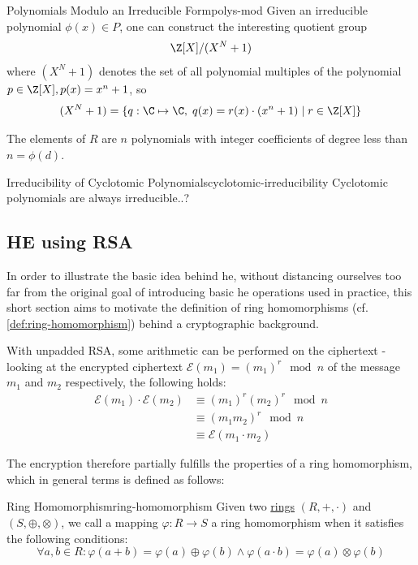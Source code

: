 \begin{corollary}{Polynomials Modulo an Irreducible Form}{polys-mod}
  Given an irreducible polynomial $\phi(x) \in P$, one can construct the interesting quotient group
  $$\Z[X] / (X^N + 1)$$
  where $(X^N + 1)$ denotes the set of all polynomial multiples of the polynomial $p \in \Z[X], p(x) = x^n + 1$, so
  $$(X^N+1) = \{q: \C \mapsto \C,\; q(x) = r(x) \cdot (x^n+1) \;|\; r \in \Z[X]\}$$

  The elements of $R$ are $n$ polynomials with integer coefficients of degree less than $n = \phi(d)$.
\end{corollary}

\begin{remark}{Irreducibility of Cyclotomic Polynomials}{cyclotomic-irreducibility}
  Cyclotomic polynomials are always irreducible..?
\end{remark}

\subsection{HE using RSA}
In order to illustrate the basic idea behind \Gls{he}, without distancing ourselves too far
from the original goal of introducing basic \gls{he} operations used in practice, this short section aims to motivate
the definition of ring homomorphisms (cf. \autoref{def:ring-homomorphism}) behind a cryptographic background.

With unpadded RSA, some arithmetic can be performed on the ciphertext - %
looking at the encrypted ciphertext $\mathcal{E}(m_1) = (m_1)^r \mod n$
of the message $m_1$ and $m_2$ respectively, the following holds:
\begin{align*}
  \mathcal{E}(m_1) \cdot \mathcal{E}(m_2)
   & \equiv (m_1)^r (m_2)^r \mod n     \\
   & \equiv (m_1 m_2)^r \mod n         \\
   & \equiv \mathcal{E}(m_1 \cdot m_2)
\end{align*}

The encryption therefore partially fulfills the properties of a ring homomorphism,
which in general terms is defined as follows:

\begin{definition}{Ring Homomorphism}{ring-homomorphism}
  Given two \hyperref[def:ring]{rings} $(R, +, \cdot)$ and $(S, \oplus, \otimes)$, we call a mapping $\varphi: R \rightarrow S$
  a ring homomorphism when it satisfies the following conditions:
  $$\forall a, b \in R: \varphi(a + b) = \varphi(a) \oplus \varphi(b) \wedge \varphi(a \cdot b) =
    \varphi(a) \otimes \varphi(b)$$
\end{definition}

